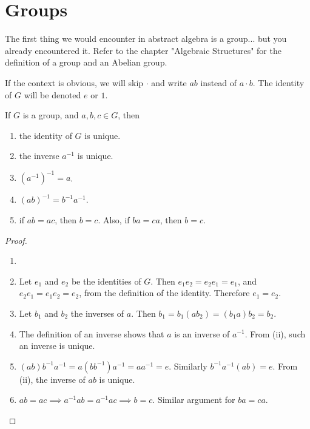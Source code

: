 

    \section{Groups}
    
    The first thing we would encounter in abstract algebra is a group... but you already encountered it. Refer to the chapter "Algebraic Structures" for the definition of a group and an Abelian group.
    
    If the context is obvious, we will skip $\cdot$ and write $ab$ instead of $a \cdot b$. The identity of $G$ will be denoted $e$ or $1$.
    
    \begin{thm} \label{thm_group_basics}
        If $G$ is a group, and $a,b,c \in G$, then \begin{enumerate}
            \item the identity of $G$ is unique.
            \item the inverse $a^{-1}$ is unique.
            \item $(a^{-1})^{-1}=a$.
            \item $(ab)^{-1} = b^{-1}a^{-1}$.
            \item if $ab=ac$, then $b=c$. Also, if $ba=ca$, then $b=c$.
        \end{enumerate}
    \end{thm}
    
    \begin{proof}
        \begin{enumerate} \item[]
        \item Let $e_1$ and $e_2$ be the identities of $G$. Then $e_1e_2=e_2e_1=e_1$, and $e_2e_1=e_1e_2=e_2$, from the definition of the identity. Therefore $e_1=e_2$.
        \item Let $b_1$ and $b_2$ the inverses of $a$. Then $b_1 = b_1(ab_2) = (b_1a)b_2 = b_2$.
        \item The definition of an inverse shows that $a$ is an inverse of $a^{-1}$. From (ii), such an inverse is unique.
        \item $(ab)b^{-1}a^{-1} = a(bb^{-1})a^{-1} = aa^{-1} = e$. Similarly $b^{-1}a^{-1}(ab) = e$. From (ii), the inverse of $ab$ is unique.
        \item $ab=ac \implies a^{-1}ab=a^{-1}ac \implies b=c$. Similar argument for $ba=ca$.
        \end{enumerate}
    \end{proof}

